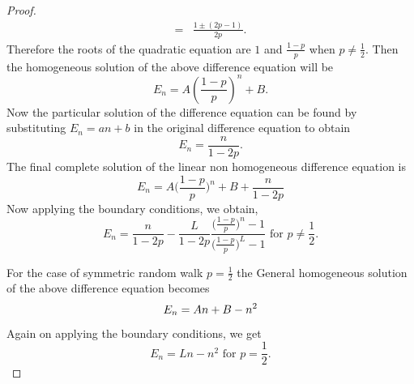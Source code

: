 \documentclass[a4paper,10pt,english]{article}
\begin{document}
\begin{proof}
\begin{align*}
	=&\frac{1\pm(2p-1)}{2p}.
	\end{align*}
	Therefore the roots of the quadratic equation are $1$ and $\frac{1-p}{p}$ when $p\neq\frac{1}{2}$. Then the homogeneous solution of the above difference equation will be 
	\begin{equation*}
	E_n=A\left(\frac{1-p}{p}\right)^n+B.
	\end{equation*}
	Now the particular solution of the difference equation can be found by substituting $E_n=an+b$ in the original difference equation to obtain 
	\begin{equation*}
	E_n=\frac{n}{1-2p}.
	\end{equation*}
	The final complete solution of the linear non homogeneous difference equation is 
	\begin{equation*}
	E_n=A\bigg(\frac{1-p}{p}\bigg)^n+B+\frac{n}{1-2p}
	\end{equation*}
	Now applying the boundary conditions, we obtain,
	\begin{equation*}
	E_n=\frac{n}{1-2p}-\frac{L}{1-2p}\frac{\big(\frac{1-p}{p}\big)^n-1}{\big(\frac{1-p}{p}\big)^L-1} \text{     for $p\neq \frac{1}{2}$}.
	\end{equation*}
	
	For the case of symmetric random walk $p=\frac{1}{2}$ the General homogeneous solution of the  above difference equation  becomes
	\begin{equation*}
	E_n=An+B-n^2\\
	\end{equation*}
	Again on applying the boundary conditions, we get
	\begin{equation*}
	E_n=Ln-n^2\text{     for $p= \frac{1}{2}$}.
	\end{equation*}
\end{proof}
\end{document}
